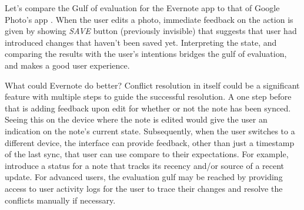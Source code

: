 \documentclass[12pt,letterpaper]{article}
\begin{document}
Let's compare the Gulf of evaluation for the Evernote app to that of Google Photo's app \cite{photos}. When the user edits a photo, immediate feedback on the action is given by showing \textit{SAVE} button (previously invisible) that suggests that user had introduced changes that haven't been saved yet. Interpreting the state, and comparing the results with the user's intentions bridges the gulf of evaluation, and makes a good user experience. 

What could Evernote do better? Conflict resolution in itself could be a significant feature with multiple steps to guide the successful resolution. A one step before that is adding feedback upon edit for whether or not the note has been synced. Seeing this on the device where the note is edited would give the user an indication on the note's current state. Subsequently, when the user switches to a different device, the interface can provide feedback, other than just a timestamp of the last sync, that user can use compare to their expectations. For example, introduce a status for a note that tracks its recency and/or source of a recent update. For advanced users, the evaluation gulf may be reached by providing access to user activity logs for the user to trace their changes and resolve the conflicts manually if necessary. 

 

\end{document}
